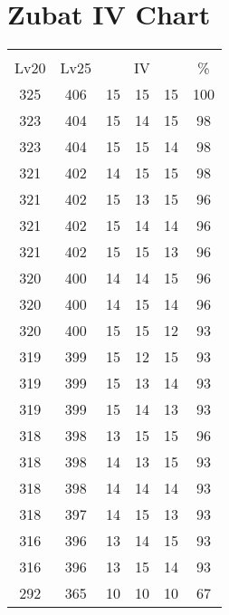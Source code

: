 \documentclass{article}%
\begin{document}
%
\normalsize%
\section{Zubat IV Chart}%
\label{sec:Zubat IV Chart}%
\renewcommand{\arraystretch}{1.5}%
\begin{tabular}{|c|c|c|c|c|c|}%
\hline%
\multicolumn{6}{|c|}{\textcolor{white}{ 
\linebreak{Zubat}
}%
\cellcolor{black}}\\%
\multicolumn{1}{|c}{Lv20}&\multicolumn{1}{c|}{Lv25}&\multicolumn{3}{c|}{IV}&\multicolumn{1}{|c|}{\%}\\%
\hline%
\rowcolor{color100}%
325&406&15&15&15&100\\%
\hline%
\rowcolor{color98}%
323&404&15&14&15&98\\%
\hline%
\rowcolor{color98}%
323&404&15&15&14&98\\%
\hline%
\rowcolor{color98}%
321&402&14&15&15&98\\%
\hline%
\rowcolor{color96}%
321&402&15&13&15&96\\%
\hline%
\rowcolor{color96}%
321&402&15&14&14&96\\%
\hline%
\rowcolor{color96}%
321&402&15&15&13&96\\%
\hline%
\rowcolor{color96}%
320&400&14&14&15&96\\%
\hline%
\rowcolor{color96}%
320&400&14&15&14&96\\%
\hline%
\rowcolor{color93}%
320&400&15&15&12&93\\%
\hline%
\rowcolor{color93}%
319&399&15&12&15&93\\%
\hline%
\rowcolor{color93}%
319&399&15&13&14&93\\%
\hline%
\rowcolor{color93}%
319&399&15&14&13&93\\%
\hline%
\rowcolor{color96}%
318&398&13&15&15&96\\%
\hline%
\rowcolor{color93}%
318&398&14&13&15&93\\%
\hline%
\rowcolor{color93}%
318&398&14&14&14&93\\%
\hline%
\rowcolor{color93}%
318&397&14&15&13&93\\%
\hline%
\rowcolor{color93}%
316&396&13&14&15&93\\%
\hline%
\rowcolor{color93}%
316&396&13&15&14&93\\%
\hline%
\rowcolor{color91}%
292&365&10&10&10&67\\%
\end{tabular}

%
\end{document}
